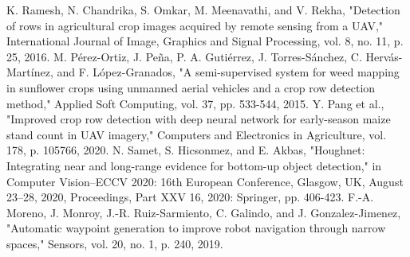 \documentclass[conference]{IEEEtran}
\begin{document}
\begin{thebibliography}{00}
 K. Ramesh, N. Chandrika, S. Omkar, M. Meenavathi, and V. Rekha, "Detection of rows in agricultural crop images acquired by remote sensing from a UAV," International Journal of Image, Graphics and Signal Processing, vol. 8, no. 11, p. 25, 2016.
 M. Pérez-Ortiz, J. Peña, P. A. Gutiérrez, J. Torres-Sánchez, C. Hervás-Martínez, and F. López-Granados, "A semi-supervised system for weed mapping in sunflower crops using unmanned aerial vehicles and a crop row detection method," Applied Soft Computing, vol. 37, pp. 533-544, 2015.
 Y. Pang et al., "Improved crop row detection with deep neural network for early-season maize stand count in UAV imagery," Computers and Electronics in Agriculture, vol. 178, p. 105766, 2020.
 N. Samet, S. Hicsonmez, and E. Akbas, "Houghnet: Integrating near and long-range evidence for bottom-up object detection," in Computer Vision–ECCV 2020: 16th European Conference, Glasgow, UK, August 23–28, 2020, Proceedings, Part XXV 16, 2020: Springer, pp. 406-423.
 F.-A. Moreno, J. Monroy, J.-R. Ruiz-Sarmiento, C. Galindo, and J. Gonzalez-Jimenez, "Automatic waypoint generation to improve robot navigation through narrow spaces," Sensors, vol. 20, no. 1, p. 240, 2019.
\end{thebibliography}

\vspace{12pt}
\end{document}
